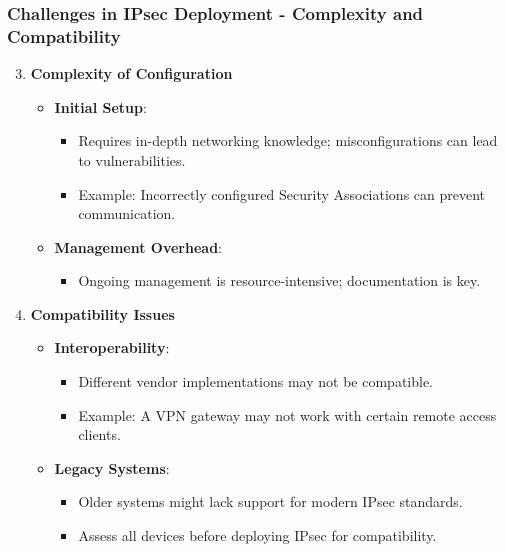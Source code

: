 \documentclass{beamer}
\begin{document}
\begin{frame}[fragile]
    \frametitle{Challenges in IPsec Deployment - Complexity and Compatibility}
    \begin{enumerate}
        \setcounter{enumi}{2}
        \item \textbf{Complexity of Configuration}
        \begin{itemize}
            \item \textbf{Initial Setup}:
            \begin{itemize}
                \item Requires in-depth networking knowledge; misconfigurations can lead to vulnerabilities.
                \item Example: Incorrectly configured Security Associations can prevent communication.
            \end{itemize}
            
            \item \textbf{Management Overhead}:
            \begin{itemize}
                \item Ongoing management is resource-intensive; documentation is key.
            \end{itemize}
        \end{itemize}

        \item \textbf{Compatibility Issues}
        \begin{itemize}
            \item \textbf{Interoperability}:
            \begin{itemize}
                \item Different vendor implementations may not be compatible.
                \item Example: A VPN gateway may not work with certain remote access clients.
            \end{itemize}

            \item \textbf{Legacy Systems}:
            \begin{itemize}
                \item Older systems might lack support for modern IPsec standards.
                \item Assess all devices before deploying IPsec for compatibility.
            \end{itemize}
        \end{itemize}
    \end{enumerate}
\end{frame}
\end{document}
